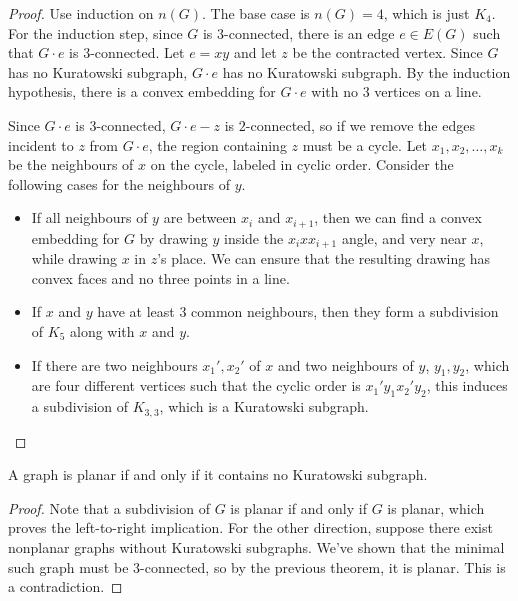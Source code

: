 \begin{proof}
  Use induction on $n(G)$.
  The base case is $n(G) = 4$, which is just $K_4$.
  For the induction step, since $G$ is $3$-connected, there is an edge $e \in
  E(G)$ such that $G \cdot e$ is $3$-connected.
  Let $e = xy$ and let $z$ be the contracted vertex.
  Since $G$ has no Kuratowski subgraph, $G \cdot e$ has no Kuratowski subgraph.
  By the induction hypothesis, there is a convex embedding for $G \cdot e$ with
  no $3$ vertices on a line.

  Since $G \cdot e$ is $3$-connected, $G \cdot e - z$ is $2$-connected, so if we
  remove the edges incident to $z$ from $G \cdot e$, the region containing $z$
  must be a cycle.
  Let $x_1, x_2, \ldots, x_k$ be the neighbours of $x$ on the cycle, labeled in
  cyclic order.
  Consider the following cases for the neighbours of $y$.
  \begin{itemize}
  \item If all neighbours of $y$ are between $x_i$ and $x_{i+1}$, then we can
	find a convex embedding for $G$ by drawing $y$ inside the $x_i x x_{i+1}$
	angle, and very near $x$, while drawing $x$ in $z$'s place.
	We can ensure that the resulting drawing has convex faces and no three
	points in a line.
  \item If $x$ and $y$ have at least $3$ common neighbours, then they form a
	subdivision of $K_5$ along with $x$ and $y$.
  \item If there are two neighbours $x_1', x_2'$ of $x$ and two neighbours of
	$y$, $y_1, y_2$, which are four different vertices such that the cyclic
	order is $x_1' y_1 x_2' y_2$, this induces a subdivision of $K_{3,3}$, which
	is a Kuratowski subgraph.
	\qedhere
  \end{itemize}
\end{proof}


\begin{theorem}[Kuratowski]
  A graph is planar if and only if it contains no Kuratowski subgraph.
\end{theorem}

\begin{proof}
  Note that a subdivision of $G$ is planar if and only if $G$ is planar, which
  proves the left-to-right implication.
  For the other direction, suppose there exist nonplanar graphs without
  Kuratowski subgraphs.
  We've shown that the minimal such graph must be $3$-connected, so by the
  previous theorem, it is planar.
  This is a contradiction.
\end{proof}

